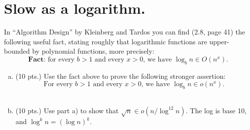 \documentclass[letterpaper,11pt]{article}
\theoremstyle{plain}
\theoremstyle{definition}
\begin{document}
\section{Slow as a logarithm.}
In ``Algorithm Design'' by Kleinberg and Tardos you can find (2.8, page 41) the following useful fact, stating roughly that logarithmic functions are upper-bounded by polynomial functions, more precisely:\\
$$\textbf{Fact:} \text{ for every $b > 1$ and every $x > 0$, we have $\log_b n \in O(n^x)$.}$$
\begin{enumerate}[a)]
\item (10 pts.) Use the fact above to prove the following stronger assertion:
$$
\text{For every $b > 1$ and every $x > 0$, we have $\log_b n \in o(n^x)$.}
$$\\        
\color{blue}
\color{black}
\item (10 pts.) Use part a) to show that $\sqrt{n} \in o(n/\log^{12} n)$. The log is base 10, and $\log^{k} n = (\log n)^k$.
\\
        \color{blue}
        \color{black}
	\end{enumerate}
\newpage
{}
\end{document}
